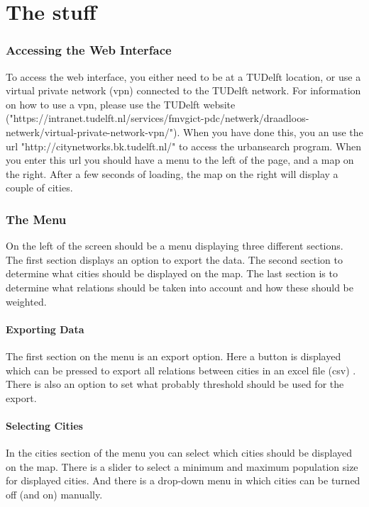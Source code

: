 \chapter{The stuff}

\subsection{Accessing the Web Interface}
To access the web interface, you either need to be at a TUDelft location, or use a virtual private network (vpn) connected to the TUDelft network. For information on how to use a vpn, please use the TUDelft website ("https://intranet.tudelft.nl/services/fmvgict-pdc/netwerk/draadloos-netwerk/virtual-private-network-vpn/"). When you have done this, you an use the url "http://citynetworks.bk.tudelft.nl/" to access the urbansearch program. When you enter this url you should have a menu to the left of the page, and a map on the right. After a few seconds of loading, the map on the right will display a couple of cities. 


\subsection{The Menu}
On the left of the screen should be a menu displaying three different sections. The first section displays an option to export the data. The second section to determine what cities should be displayed on the map. The last section is to determine what relations should be taken into account and how these should be weighted.

\subsubsection{Exporting Data}
The first section on the menu is an export option. Here a button is displayed which can be pressed to export all relations between cities in an excel file (csv) . There is also an option to set what probably threshold should be used for the export. 


\subsubsection{Selecting Cities}
In the cities section of the menu you can select which cities should be displayed on the map. There is a slider to select a minimum and maximum population size for displayed cities. And there is a drop-down menu in which cities can be turned off (and on) manually. 


